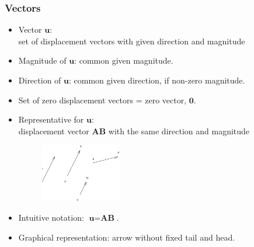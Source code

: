 \begin{frame}
 \frametitle{Vectors}

  \begin{itemize}
   \item Vector $\textbf{u}$: \\
      set of displacement vectors with given direction and magnitude

    \item  Magnitude of $\textbf{u}$: common given magnitude.

    \item Direction of $\textbf{u}$: common given direction, if non-zero magnitude.

    \item Set of zero displacement vectors = zero vector, $\textbf{0}$. \pause

    \item Representative for $\textbf{u}$: \\
      displacement vector $\textbf{AB}$ with the same direction and magnitude

\begin{figure}[h]
  \includegraphics[height=1in]{../../modules/vectors/pictures/ok-vector_representatives.eps}
  \label{fig:vector_representative}

\end{figure}

    \item Intuitive notation:  $\textbf{u}=\textbf{AB}$.

    \item Graphical representation: arrow without fixed tail and head.

  \end{itemize}
\end{frame}